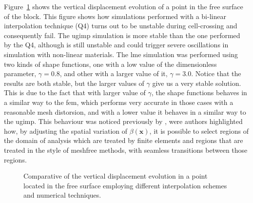 \documentclass[preprint,12pt,a4paper]{elsarticle}
\newcommand{\vect}[1]{
  \ensuremath{\mathbf{{#1}}}
}
\begin{document}
Figure~\ref{fig:vertical-displacement-block} shows the vertical
displacement evolution of a point in the free surface of the
block. This figure shows how simulations performed with a bi-linear
interpolation technique (Q4) turns out to be unstable during
cell-crossing and consequently fail. The \acrshort{ugimp} simulation
is more stable than the one performed by the Q4, although is still
unstable and could trigger severe oscillations in simulation with
non-linear  materials. The \acrshort{lme} simulation was performed
using two kinds of shape functions, one with a low value of the
dimensionless parameter, $\gamma = 0.8$, and other with a larger value
of it, $\gamma = 3.0$. Notice that the results are both stable, but
the larger values of $\gamma$ give us a very stable solution. This is
due to the fact that with larger value of $\gamma$, the shape
functions behaves in a similar way to the \acrshort{fem}, which performs very
accurate in those cases with a reasonable mesh distorsion, and with a
lower value it behaves in a similar way to the \acrshort{ugimp}. This behaviour
was noticed previously by \cite{Arroyo2006}, were authors highlighted
how, by adjusting the spatial variation of $\beta(\vect{x})$, it is
possible to select regions of the domain of analysis which are treated
by finite elements and regions that are treated in the style of
meshfree methods, with seamless transitions between those regions. 
\begin{figure}\sidecaption
  \centering
  \caption{Comparative of the vertical displacement evolution in a
    point located in the free surface employing different
    interpolation schemes and numerical techniques.} 
  \label{fig:vertical-displacement-block}
\end{figure}
\end{document}
